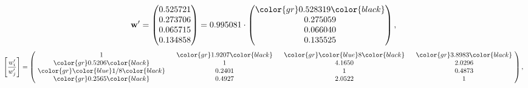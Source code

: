 \begin{example}
\begin{equation*}
\mathbf{w}^{\prime} =
\begin{pmatrix}
0.525721\\
0.273706\\
0.065715\\
0.134858
\end{pmatrix} =
0.995081\cdot
\begin{pmatrix}
\color{gr} 0.528319\color{black} \\
0.275059\\
0.066040\\
0.135525
\end{pmatrix},
\end{equation*}
\begin{equation*}
\left[ \frac{{w}^{\prime}_i}{{w}^{\prime}_j} \right] =
\begin{pmatrix}
$\,\,$ 1 $\,\,$ & $\,\,$\color{gr} 1.9207\color{black} $\,\,$ & $\,\,$\color{gr} \color{blue} 8\color{black} $\,\,$ & $\,\,$\color{gr} 3.8983\color{black} $\,\,$ \\
$\,\,$\color{gr} 0.5206\color{black} $\,\,$ & $\,\,$ 1 $\,\,$ & $\,\,$4.1650$\,\,$ & $\,\,$2.0296  $\,\,$ \\
$\,\,$\color{gr} \color{blue}  1/8\color{black} $\,\,$ & $\,\,$0.2401$\,\,$ & $\,\,$ 1 $\,\,$ & $\,\,$0.4873 $\,\,$ \\
$\,\,$\color{gr} 0.2565\color{black} $\,\,$ & $\,\,$0.4927$\,\,$ & $\,\,$2.0522$\,\,$ & $\,\,$ 1  $\,\,$ \\
\end{pmatrix},
\end{equation*}
\end{example}
\newpage
